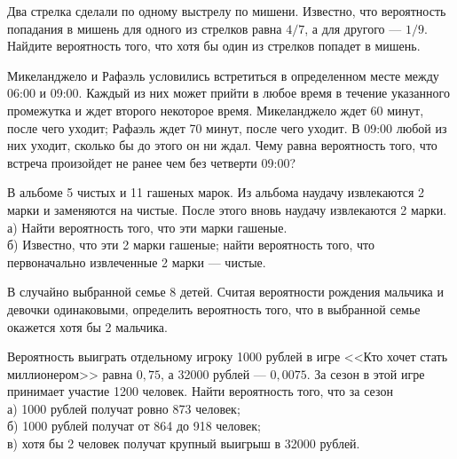 \newpage\setcounter{zad}{0}



\begin{zkrW}{20}\noindent 
	Два стрелка сделали по одному выстрелу по мишени. Известно, что вероятность попадания в мишень для одного из стрелков равна $4/7$, а для другого --- $1/9$. Найдите вероятность того, что хотя бы один из стрелков попадет в мишень.
 
\end{zkrW}

\begin{zkrW}{20}\noindent 
	Микеланджело и Рафаэль условились встретиться в определенном месте между 06:00 и 09:00. Каждый из них может прийти в любое время в течение указанного промежутка и ждет второго некоторое время. Микеланджело ждет 60 минут, после чего уходит; Рафаэль ждет 70 минут, после чего уходит. В 09:00 любой из них уходит, сколько бы до этого он ни ждал. Чему равна вероятность того, что встреча произойдет не ранее чем без четверти 09:00?
 
\end{zkrW}

\begin{zkrW}{20}\noindent 
	В альбоме 5 чистых и 11 гашеных марок. Из альбома наудачу извлекаются 2 марки и заменяются на чистые. После этого вновь наудачу извлекаются 2 марки. \\ \indent а) Найти вероятность того, что эти марки гашеные. \\ \indent б) Известно, что эти 2 марки гашеные; найти вероятность того, что первоначально извлеченные 2 марки --- чистые.
 
\end{zkrW}

\begin{zkrW}{20}\noindent 
	В случайно выбранной семье 8 детей. Считая вероятности рождения мальчика и девочки одинаковыми, определить вероятность того, что в выбранной семье окажется хотя бы 2 мальчика.
 
\end{zkrW}

\begin{zkrW}{20}\noindent 
	Вероятность выиграть отдельному игроку 1000 рублей в игре <<Кто хочет стать миллионером>> равна $0{,}75$, а 32000 рублей --- $0{,}0075$. За сезон в этой игре принимает участие 1200 человек. Найти вероятность того, что за сезон \\ \indent а) 1000 рублей получат ровно 873 человек; \\ \indent б) 1000 рублей получат от 864 до 918 человек; \\ \indent в) хотя бы 2 человек получат крупный выигрыш в 32000 рублей.
 
\end{zkrW}


